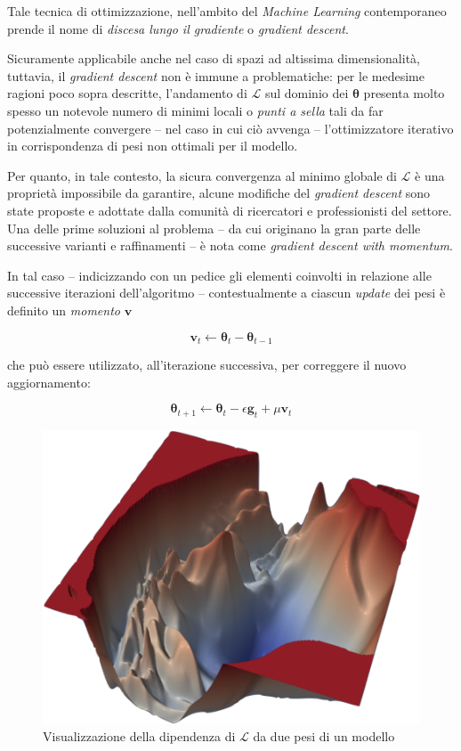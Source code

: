 \documentclass[a4paper, twoside]{article}
\begin{document}
Tale tecnica di ottimizzazione, nell'ambito del \textit{Machine Learning} contemporaneo prende il nome di \textit{discesa lungo il gradiente} o \textit{gradient descent}.

Sicuramente applicabile anche nel caso di spazi ad altissima dimensionalità, tuttavia, il \textit{gradient descent} non è immune a problematiche: per le medesime ragioni poco sopra descritte, l'andamento di $\mathcal{L}$ sul dominio dei $\boldsymbol{\theta}$ presenta molto spesso un notevole numero di minimi locali o \textit{punti a sella} tali da far potenzialmente convergere -- nel caso in cui ciò avvenga -- l'ottimizzatore iterativo in corrispondenza di pesi non ottimali per il modello.

Per quanto, in tale contesto, la sicura convergenza al minimo globale di $\mathcal{L}$ è una proprietà impossibile da garantire, alcune modifiche del \textit{gradient descent} sono state proposte e adottate dalla comunità di ricercatori e professionisti del settore. Una delle prime soluzioni al problema -- da cui originano la gran parte delle successive varianti e raffinamenti -- è nota come \textit{gradient descent with momentum}.

In tal caso -- indicizzando con un pedice gli elementi coinvolti in relazione alle successive iterazioni dell'algoritmo --  contestualmente a ciascun \textit{update} dei pesi è definito un \textit{momento} $\boldsymbol{v}$

$$
\boldsymbol{v}_t \leftarrow \boldsymbol{\theta}_t - \boldsymbol{\theta}_{t-1}
$$

che può essere utilizzato, all'iterazione successiva, per correggere il nuovo aggiornamento:

$$
\boldsymbol{\theta}_{t+1} \leftarrow \boldsymbol{\theta}_{t} - \epsilon \boldsymbol{g}_{t} + \mu \boldsymbol{v}_t
$$

\begin{figure}
	\includegraphics[width=0.94\linewidth]{loss-landscape.png}
	\captionsetup{labelformat=empty}
	\caption{Visualizzazione della dipendenza di $\mathcal{L}$ da due pesi di un modello}
\end{figure}
\end{document}
